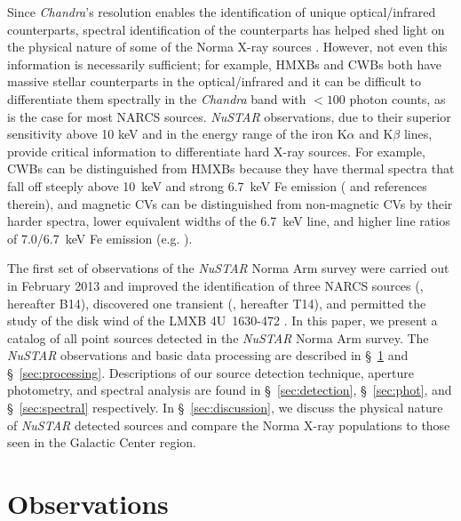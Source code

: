 \documentclass[iop,revtex4]{emulateapj}
\begin{document}
Since \textit{Chandra}'s resolution enables the identification of unique optical/infrared counterparts, spectral identification of the counterparts has helped shed light on the physical nature of some of the Norma X-ray sources \citep{rahoui14}.  However, not even this information is necessarily sufficient; for example, HMXBs and CWBs both have massive stellar counterparts in the optical/infrared and it can be difficult to differentiate them spectrally in the \textit{Chandra} band with $<100$ photon counts, as is the case for most  NARCS sources.  \textit{NuSTAR} observations, due to their superior sensitivity above 10 keV and in the energy range of the iron K$\alpha$ and K$\beta$ lines, provide critical information to differentiate hard X-ray sources.  For example, CWBs can be distinguished from HMXBs because they have thermal spectra that fall off steeply above 10~keV and strong 6.7~keV Fe emission (\citealt{mikles06} and references therein), and magnetic CVs can be distinguished from non-magnetic CVs by their harder spectra, lower equivalent widths of the 6.7~keV line, and higher line ratios of 7.0/6.7~keV Fe emission (e.g. \citealt{xu16}).
\par
The first set of observations of the \textit{NuSTAR} Norma Arm survey were carried out in February 2013 and improved the identification of three NARCS sources (\citealt{bodaghee14}, hereafter B14), discovered one transient (\citealt{tomsick14}, hereafter T14), and permitted the study of the disk wind of the LMXB 4U~1630-472 \citep{king14}.  In this paper, we present a catalog of all point sources detected in the \textit{NuSTAR} Norma Arm survey.  The \textit{NuSTAR} observations and basic data processing are described in \S~\ref{sec:obs} and \S~\ref{sec:processing}.  Descriptions of our source detection technique, aperture photometry, and spectral analysis are found in \S~\ref{sec:detection}, \S~\ref{sec:phot}, and \S~\ref{sec:spectral} respectively.  In \S~\ref{sec:discussion}, we discuss the physical nature of \textit{NuSTAR} detected sources and compare the Norma X-ray populations to those seen in the Galactic Center region.

\section{Observations}
\label{sec:obs}
\end{document}
